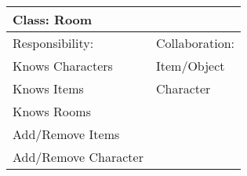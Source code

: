 \vspace{0.4cm}
\begin{tabular}{|p{7cm}|p{7cm}|} \hline
\multicolumn{2}{|l|}{Class:  Room} \\ \hline
Responsibility:  & Collaboration:  \\ \hline
 Knows Characters &  Item/Object \\ 
 Knows Items &  Character \\ 
 Knows Rooms &   \\ 
 Add/Remove Items &   \\ 
 Add/Remove Character &   \\ 
\hline
\end{tabular}
\vspace{0.8cm}
